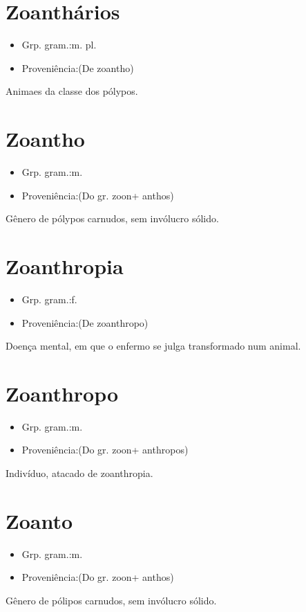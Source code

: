 \section{Zoanthários}
\begin{itemize}
\item {Grp. gram.:m. pl.}
\end{itemize}
\begin{itemize}
\item {Proveniência:(De \textunderscore zoantho\textunderscore )}
\end{itemize}
Animaes da classe dos pólypos.
\section{Zoantho}
\begin{itemize}
\item {Grp. gram.:m.}
\end{itemize}
\begin{itemize}
\item {Proveniência:(Do gr. \textunderscore zoon\textunderscore  + \textunderscore anthos\textunderscore )}
\end{itemize}
Gênero de pólypos carnudos, sem invólucro sólido.
\section{Zoanthropia}
\begin{itemize}
\item {Grp. gram.:f.}
\end{itemize}
\begin{itemize}
\item {Proveniência:(De \textunderscore zoanthropo\textunderscore )}
\end{itemize}
Doença mental, em que o enfermo se julga transformado num animal.
\section{Zoanthropo}
\begin{itemize}
\item {Grp. gram.:m.}
\end{itemize}
\begin{itemize}
\item {Proveniência:(Do gr. \textunderscore zoon\textunderscore  + \textunderscore anthropos\textunderscore )}
\end{itemize}
Indivíduo, atacado de zoanthropia.
\section{Zoanto}
\begin{itemize}
\item {Grp. gram.:m.}
\end{itemize}
\begin{itemize}
\item {Proveniência:(Do gr. \textunderscore zoon\textunderscore  + \textunderscore anthos\textunderscore )}
\end{itemize}
Gênero de pólipos carnudos, sem invólucro sólido.
